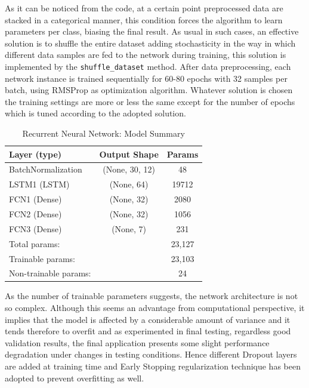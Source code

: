 As it can be noticed from the code, at a certain point preprocessed data are stacked in a categorical manner, this condition forces the algorithm to learn parameters per class, biasing the final result. As usual in such cases, an effective solution is to shuffle the entire dataset adding stochasticity in the way in which different data samples are fed to the network during training, this solution is implemented by the \texttt{shuffle_dataset} method.\newline
After data preprocessing, each network instance is trained sequentially for 60-80 epochs with 32 samples per batch, using RMSProp as optimization algorithm. Whatever solution is chosen the training settings are more or less the same except for the number of epochs which is tuned according to the adopted  solution.

\begin{table}[H]
	\begin{tabular}{||p{5cm}cc||}
		\hline
		Layer (type)      &           Output Shape        &      Params \T\B	\\
		\hline
		\hline
		BatchNormalization    &		  (None, 30, 12)       &     48          \T\B \\
		\hline
		LSTM1 (LSTM)          &       (None, 64)           &     19712     	 \T\B \\
		\hline
		FCN1 (Dense)          &       (None, 32)           &     2080       \T\B \\
		\hline
		FCN2 (Dense)          &       (None, 32)           &     1056      	\T\B \\
		\hline
		FCN3 (Dense)          &       (None, 7)            &     231       \T\B \\ 
		\hline
		\hline
		Total params:   &&										23,127\T  \\
		Trainable params:  && 	  								23,103\\
		Non-trainable params:  && 								24\B  \\
		\hline
		
	\end{tabular}
	\centering
	\caption{\label{tab:2}Recurrent Neural Network: Model Summary}
\end{table}
As the number of trainable parameters suggests, the network architecture is not so complex. Although this seems an advantage from computational perspective, it implies that the model is affected by a considerable amount of variance and it tends therefore to overfit and as experimented in final testing, regardless good validation results, the final application presents some slight performance degradation under changes in testing conditions.\newline
Hence different Dropout layers are added at training time and Early Stopping regularization technique has been adopted to prevent overfitting as well.

